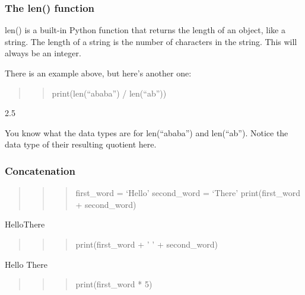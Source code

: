 \documentclass[11pt]{article}
\begin{document}
    \hypertarget{the-len-function}{%
\subsubsection{The len() function}\label{the-len-function}}

len() is a built-in Python function that returns the length of an
object, like a string. The length of a string is the number of
characters in the string. This will always be an integer.

There is an example above, but here's another one:

\begin{quote}
\begin{quote}
print(len(``ababa'') / len(``ab''))
\end{quote}
\end{quote}

2.5

You know what the data types are for len(``ababa'') and len(``ab'').
Notice the data type of their resulting quotient here.

    \hypertarget{concatenation}{%
\subsubsection{Concatenation}\label{concatenation}}

\begin{quote}
\begin{quote}
\begin{quote}
first\_word = `Hello' second\_word = `There' print(first\_word +
second\_word)
\end{quote}
\end{quote}
\end{quote}

HelloThere

\begin{quote}
\begin{quote}
\begin{quote}
print(first\_word + ' ' + second\_word)
\end{quote}
\end{quote}
\end{quote}

Hello There

\begin{quote}
\begin{quote}
\begin{quote}
print(first\_word * 5)
\end{quote}
\end{quote}
\end{quote}
\end{document}
